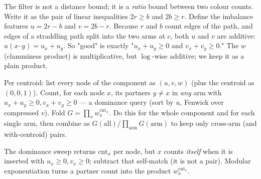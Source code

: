 The filter is not a distance bound; it is a \emph{ratio} bound between two colour counts.
Write it as the pair of linear inequalities \(2r\ge b\) and \(2b\ge r\). Define the
imbalance features \(u=2r-b\) and \(v=2b-r\). Because \(r\) and \(b\) count edges of the
path, and edges of a straddling path split into the two arms at \(c\), both \(u\) and
\(v\) are additive: \(u(x\text{--}y)=u_x+u_y\). So "good" is exactly
"\(u_x+u_y\ge0\) and \(v_x+v_y\ge0\)." The \(w\) (clamminess product) is multiplicative,
but \(\log\)-wise additive; we keep it as a plain product.

Per centroid: list every node of the component as \((u,v,w)\) (plus the centroid as
\((0,0,1)\)). Count, for each node \(x\), its partners \(y\ne x\) in \emph{any} arm with
\(u_x+u_y\ge0,v_x+v_y\ge0\) --- a dominance query (sort by \(u\), Fenwick over compressed
\(v\)). Fold \(G=\prod_x w_x^{\mathrm{cnt}_x}\). Do this for the whole component and for
each single arm, then combine as \(G(\text{all})/\prod_{\text{arm}}G(\text{arm})\) to keep
only cross-arm (and with-centroid) pairs.

The dominance sweep returns \(\mathrm{cnt}_x\) per node, but \(x\) counts \emph{itself}
when it is inserted with \(u_x\ge0,v_x\ge0\); subtract that self-match (it is not a pair).
Modular exponentiation turns a partner count into the product \(w_x^{\mathrm{cnt}_x}\).

